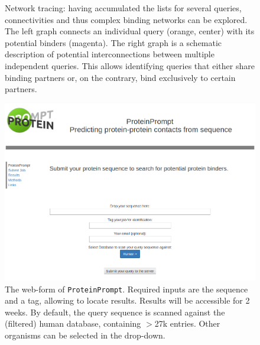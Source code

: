 \documentclass{article}
\newcommand{\tool}{\texttt{ProteinPrompt}}
\begin{document}
\begin{figure}
  
  \caption{Network tracing: having accumulated the lists for several queries, connectivities and thus complex binding networks can be explored.
   The left graph connects an individual query (orange, center) with its potential binders (magenta).
   The right graph is a schematic description of potential interconnections between multiple independent queries.
   This allows identifying queries that either share binding partners or, on the contrary, bind exclusively to certain partners. }
  \label{fig:connect}
\end{figure}

\begin{figure}
  \hspace{-1.5cm}\includegraphics[width=1.2\linewidth]{material/webform.png}
  \caption{ The web-form of \tool.
    Required inputs are the sequence and a tag, allowing to locate results.
    Results will be accessible for 2 weeks.
    By default, the query sequence is scanned against the (filtered) human database, containing $>$27k entries.
    Other organisms can be selected in the drop-down.}
  \label{fig:webform}
\end{figure}


\clearpage


\end{document}
